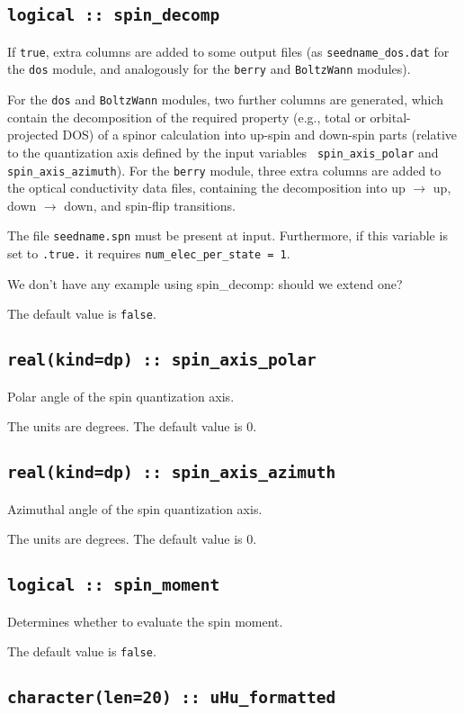\subsection[spin\_decomp]{\tt logical :: spin\_decomp}
If {\tt true}, extra columns are added to some output files (as
{\tt seedname\_dos.dat} for the {\tt dos} module, and analogously for
the {\tt berry} and {\tt BoltzWann} modules).

For the {\tt dos} and {\tt BoltzWann} modules, two
further columns are generated, which contain the decomposition of the required property
(e.g., total or orbital-projected DOS)
of a spinor calculation into up-spin and down-spin parts (relative to
the quantization axis defined by the input variables {\tt
  spin\_axis\_polar} and {\tt spin\_axis\_azimuth}). 
For the {\tt berry} module, three extra columns are added to the optical
conductivity data files, containing the decomposition into up
$\rightarrow$ up, down $\rightarrow$ down, and spin-flip transitions.

The file {\tt seedname.spn} must be present at input. Furthermore, if
this variable is set to \verb#.true.# it
requires {\tt num\_elec\_per\_state = 1}.

{\color{red} We don't have any example using spin\_decomp: should we
  extend one?}

The default value is \verb#false#.

  \subsection{\tt real(kind=dp) :: spin\_axis\_polar}
Polar angle of the spin quantization axis.

The units are degrees. The default value is 0.

\subsection{\tt real(kind=dp) :: spin\_axis\_azimuth}
Azimuthal angle of the spin quantization axis. 

The units are degrees. The default value is 0.

\subsection[spin\_moment]{\tt logical :: spin\_moment}
Determines whether to evaluate the spin moment.

The default value is \verb#false#.

\subsection[uHu\_formatted]{\tt character(len=20) :: uHu\_formatted}

